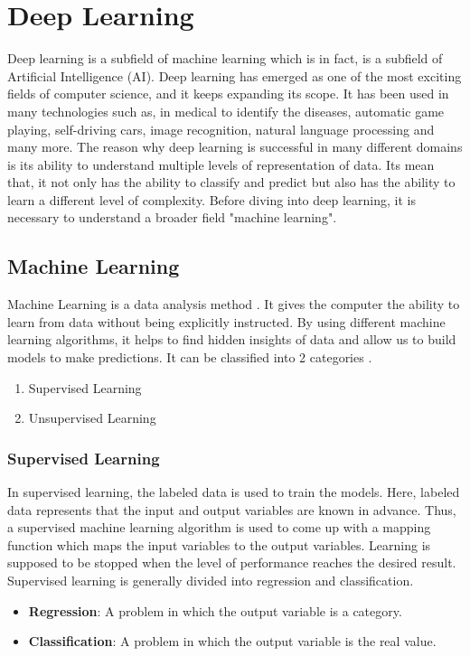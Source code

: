 \chapter{Deep Learning}

Deep learning is a subfield of machine learning which is in fact, is a subfield of Artificial Intelligence (AI). Deep learning has emerged as one of the most exciting fields of computer science, and it keeps expanding its scope. It has been used in many technologies such as, in medical to identify the diseases, automatic game playing, self-driving cars, image recognition, natural language processing and many more. The reason why deep learning is successful in many different domains is its ability to understand multiple levels of representation of data. Its mean that, it not only has the ability to classify and predict but also has the ability to learn a different level of complexity. Before diving into deep learning, it is necessary to understand a broader field "machine learning".

\section{Machine Learning}

Machine Learning is a data analysis method \cite{bishop2006pattern}. It gives the computer the ability to learn from data without being explicitly instructed. By using different machine learning algorithms, it helps to find hidden insights of data and allow us to build models to make predictions. It can be classified into 2 categories \cite{machinelearningmastery}.

\begin{enumerate}
	\item Supervised Learning
	\item Unsupervised Learning
\end{enumerate}

\subsection{Supervised Learning}

In supervised learning, the labeled data is used to train the models. Here, labeled data represents that the input and output variables are known in advance. Thus, a supervised machine learning algorithm is used to come up with a mapping function which maps the input variables to the output variables. Learning is supposed to be stopped when the level of performance reaches the desired result. Supervised learning is generally divided into regression and classification.
\begin{itemize}
	\item \textbf{Regression}: A problem in which the output variable is a category.
	\item \textbf{Classification}: A problem in which the output variable is the real value.
\end{itemize}

